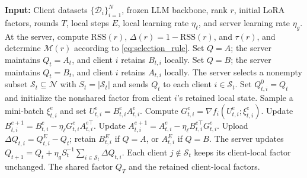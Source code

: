 \documentclass[lettersize,journal]{IEEEtran}
\begin{document}
	\begin{algorithm}[t]
		\caption{FedAS-LoRA}
		\label{alg:fedas_lora_training}
		\begin{algorithmic}[1]
			\STATE \textbf{Input:} Client datasets $\{\mathcal{D}_i\}_{i=1}^{N}$, frozen LLM backbone, rank $r$, initial LoRA factors, rounds $T$, local steps $E$, local learning rate $\eta_{\ell}$, and server learning rate $\eta_g$.
			\STATE At the server, compute $\mathrm{RSS}(r)$, $\Delta(r)=1-\mathrm{RSS}(r)$, and $\tau(r)$, and determine $\mathcal{M}(r)$ according to \eqref{eq:selection_rule}.
			\STATE Set $Q=A$; the server maintains $Q_t=A_t$, and client $i$ retains $B_{t,i}$ locally.
			\ELSE
			\STATE Set $Q=B$; the server maintains $Q_t=B_t$, and client $i$ retains $A_{t,i}$ locally.
			\ENDIF
			\STATE The server selects a nonempty subset $\mathcal{S}_t\subseteq\mathcal{N}$ with $S_t=|\mathcal{S}_t|$ and sends $Q_t$ to each client $i\in\mathcal{S}_t$.
			\STATE Set $Q_{t,i}^{0}=Q_t$ and initialize the nonshared factor from client $i$'s retained local state.
			\STATE Sample a mini-batch $\xi_{t,i}^{e}$ and set $U_{t,i}^{e}=B_{t,i}^{e}A_{t,i}^{e}$.
			\STATE Compute $G_{t,i}^{e}=\nabla f_i(U_{t,i}^{e};\xi_{t,i}^{e})$.
			\STATE Update $B_{t,i}^{e+1}=B_{t,i}^{e}-\eta_{\ell}G_{t,i}^{e}A_{t,i}^{e\top}$.
			\STATE Update $A_{t,i}^{e+1}=A_{t,i}^{e}-\eta_{\ell}B_{t,i}^{e\top}G_{t,i}^{e}$.
			\ENDFOR
			\STATE Upload $\Delta Q_{t,i}=Q_{t,i}^{E}-Q_t$; retain $B_{t,i}^{E}$ if $Q=A$, or $A_{t,i}^{E}$ if $Q=B$.
			\ENDFOR
			\STATE The server updates
			$Q_{t+1}=Q_t+\eta_g S_t^{-1}\sum_{i\in\mathcal{S}_t}\Delta Q_{t,i}$.
			\STATE Each client $j\notin\mathcal{S}_t$ keeps its client-local factor unchanged.
			\ENDFOR
			\RETURN The shared factor $Q_T$ and the retained client-local factors.
		\end{algorithmic}
	\end{algorithm}
\end{document}

